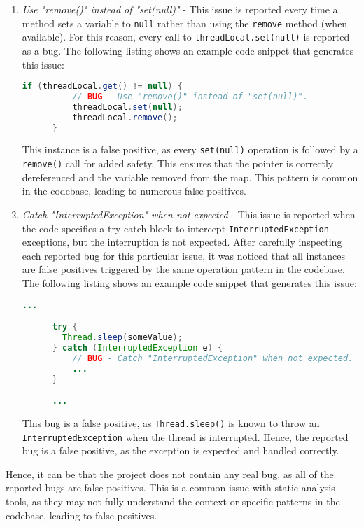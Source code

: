 \begin{enumerate}
	\item \textit{Use "remove()" instead of "set(null)"} - This issue is reported every time a method sets a variable to \texttt{null} rather than using the \texttt{remove} method (when available). For this reason, every call to \texttt{threadLocal.set(null)} is reported as a bug. The following listing shows an example code snippet that generates this issue:

	      \begin{lstlisting}[language=Java]
      if (threadLocal.get() != null) {
          // BUG - Use "remove()" instead of "set(null)".
          threadLocal.set(null);
          threadLocal.remove();
      }
    \end{lstlisting}

	      \noindent This instance is a false positive, as every \texttt{set(null)} operation is followed by a \texttt{remove()} call for added safety. This ensures that the pointer is correctly dereferenced and the variable removed from the map. This pattern is common in the codebase, leading to numerous false positives.

	\item \textit{Catch "InterruptedException" when not expected} - This issue is reported when the code specifies a try-catch block to intercept \texttt{InterruptedException} exceptions, but the interruption is not expected. After carefully inspecting each reported bug for this particular issue, it was noticed that all instances are false positives triggered by the same operation pattern in the codebase. The following listing shows an example code snippet that generates this issue:

	      \begin{lstlisting}[language=Java]
      ...

      try {
        Thread.sleep(someValue);
      } catch (InterruptedException e) {
          // BUG - Catch "InterruptedException" when not expected.
          ...
      }

      ...
    \end{lstlisting}
	      \noindent  This bug is a false positive, as \texttt{Thread.sleep()} is known to throw an \texttt{InterruptedException} when the thread is interrupted. Hence, the reported bug is a false positive, as the exception is expected and handled correctly.

\end{enumerate}

\noindent Hence, it can be that the project does not contain any real bug, as all of the reported bugs are false positives. This is a common issue with static analysis tools, as they may not fully understand the context or specific patterns in the codebase, leading to false positives.

